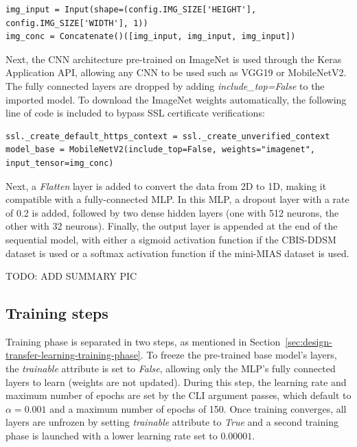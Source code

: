 \begin{lstlisting}[numbers=none]
img_input = Input(shape=(config.IMG_SIZE['HEIGHT'], config.IMG_SIZE['WIDTH'], 1))
img_conc = Concatenate()([img_input, img_input, img_input])
\end{lstlisting}

Next, the CNN architecture pre-trained on ImageNet is used through the Keras Application API, allowing any CNN to be used such as VGG19 or MobileNetV2. The fully connected layers are dropped by adding \textit{include\_top=False} to the imported model. To download the ImageNet weights automatically, the following line of code is included to bypass SSL certificate verifications:

\begin{lstlisting}[numbers=none]
ssl._create_default_https_context = ssl._create_unverified_context
model_base = MobileNetV2(include_top=False, weights="imagenet", input_tensor=img_conc)
\end{lstlisting}

Next, a \textit{Flatten} layer is added to convert the data from 2D to 1D, making it compatible with a fully-connected MLP. In this MLP, a dropout layer with a rate of 0.2 is added, followed by two dense hidden layers (one with 512 neurons, the other with 32 neurons). Finally, the output layer is appended at the end of the sequential model, with either a sigmoid activation function if the CBIS-DDSM dataset is used or a softmax activation function if the mini-MIAS dataset is used.

TODO: ADD SUMMARY PIC



\subsection{Training steps} 

Training phase is separated in two steps, as mentioned in Section~\ref{sec:design-transfer-learning-training-phase}. To freeze the pre-trained base model's layers, the \textit{trainable} attribute is set to \textit{False}, allowing only the MLP's fully connected layers to learn (weights are not updated). During this step, the learning rate and maximum number of epochs are set by the CLI argument passes, which default to $\alpha = 0.001$ and a maximum number of epochs of 150. Once training converges, all layers are unfrozen by setting \textit{trainable} attribute to \textit{True} and a second training phase is launched with a lower learning rate set to $0.00001$.\\

